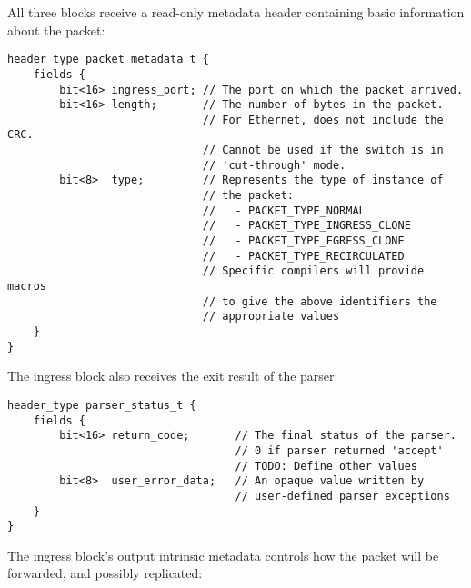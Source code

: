 All three blocks receive a read-only metadata header containing basic
information about the packet:

\begin{lstlisting}[style=P4style]
header_type packet_metadata_t {
    fields {
        bit<16> ingress_port; // The port on which the packet arrived.
        bit<16> length;       // The number of bytes in the packet. 
                              // For Ethernet, does not include the CRC. 
                              // Cannot be used if the switch is in
                              // 'cut-through' mode.
        bit<8>  type;         // Represents the type of instance of
                              // the packet: 
                              //   - PACKET_TYPE_NORMAL
                              //   - PACKET_TYPE_INGRESS_CLONE
                              //   - PACKET_TYPE_EGRESS_CLONE
                              //   - PACKET_TYPE_RECIRCULATED
                              // Specific compilers will provide macros
                              // to give the above identifiers the
                              // appropriate values
    }
}
\end{lstlisting}

The ingress block also receives the exit result of the parser: 

\begin{lstlisting}[style=P4style]
header_type parser_status_t {
    fields {
        bit<16> return_code;       // The final status of the parser.
                                   // 0 if parser returned 'accept'
                                   // TODO: Define other values 
        bit<8>  user_error_data;   // An opaque value written by
                                   // user-defined parser exceptions
    }
}
\end{lstlisting}

The ingress block's output intrinsic metadata controls how the packet will be
forwarded, and possibly replicated:

